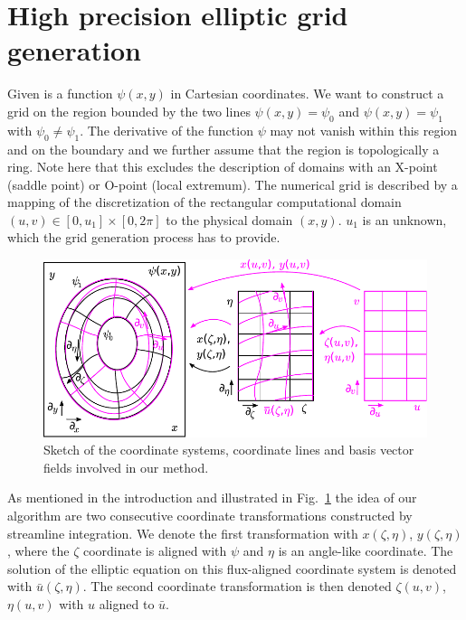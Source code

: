 \documentclass{hitec} %
\begin{document}
\section{High precision elliptic grid generation} \label{sec:geometry}

Given is a function $\psi(x,y)$ in Cartesian coordinates. 
We want to construct a grid on the region 
bounded by the two lines
$\psi(x,y) = \psi_0$ and $\psi(x,y)=\psi_1$ with $\psi_0\neq\psi_1$.
The derivative of the function $\psi$ may not vanish within this region and on the boundary and 
we further assume that the region is topologically a ring. 
Note here that this excludes the description of domains with an X-point (saddle point) or O-point (local extremum). 
The numerical grid is described by a mapping of the discretization of the rectangular
computational domain $(u,v) \in [0,u_1]\times[0,2\pi]$ to the physical domain $(x,y)$. $u_1$ is an unknown, which the grid generation process has to provide. 

\begin{figure}[htbp]
\centering
\includegraphics[trim = 0px 0px 0px 0px, clip, scale=1.0]{./drawing_magenta}
\caption{
  Sketch of the coordinate systems, coordinate lines and basis vector fields 
  involved in our method.
}
\label{fig:sketch}
\end{figure}
As mentioned in the introduction and illustrated in Fig.~\ref{fig:sketch} the idea of our algorithm are two consecutive coordinate transformations constructed by streamline integration. 
We denote the first transformation with $x(\zeta, \eta)$, $y(\zeta, \eta)$, where
the $\zeta$ coordinate is aligned with $\psi$ and $\eta$ is an angle-like coordinate. The solution of the 
elliptic equation on this flux-aligned coordinate system is denoted with $\bar u(\zeta, \eta)$. 
The second coordinate transformation is then denoted $\zeta(u,v)$, $\eta(u,v)$ with $u$ aligned to $\bar u$.
\end{document}
